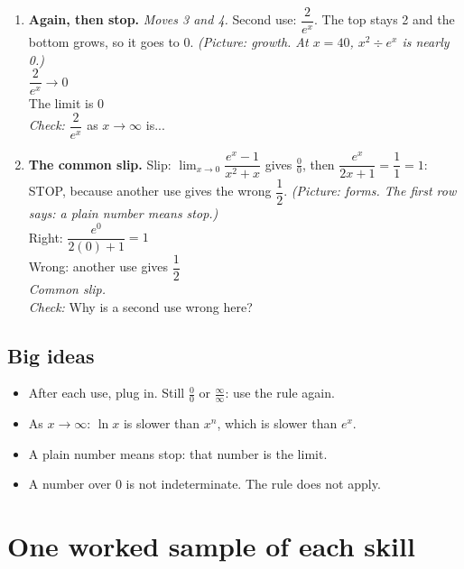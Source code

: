 \documentclass[11pt]{article}
\begin{document}
\begin{enumerate}
\item \textbf{Again, then stop.} \textit{Moves 3 and 4.} Second use: $\dfrac{2}{e^x}$. The top stays 2 and the bottom grows, so it goes to 0. \textit{(Picture: growth. At $x=40$, $x^2\div e^x$ is nearly 0.)}\\ $\dfrac{2}{e^x}\to0$\\ The limit is $0$\\ \textit{Check:} $\dfrac{2}{e^x}$ as $x\to\infty$ is... 
\item \textbf{The common slip.} Slip: $\displaystyle\lim_{x\to0}\dfrac{e^x-1}{x^2+x}$ gives $\frac00$, then $\dfrac{e^x}{2x+1}=\dfrac11=1$: STOP, because another use gives the wrong $\dfrac12$. \textit{(Picture: forms. The first row says: a plain number means stop.)}\\ Right: $\dfrac{e^0}{2(0)+1}=1$\\ Wrong: another use gives $\dfrac12$\\ \textit{Common slip.}\\ \textit{Check:} Why is a second use wrong here? 
\end{enumerate}
\subsection*{Big ideas}\begin{itemize}\item After each use, plug in. Still $\frac00$ or $\frac{\infty}{\infty}$: use the rule again.
\item As $x\to\infty$: $\ln x$ is slower than $x^n$, which is slower than $e^x$.
\item A plain number means stop: that number is the limit.
\item A number over 0 is not indeterminate. The rule does not apply.\end{itemize}
\section*{One worked sample of each skill}
\end{document}
